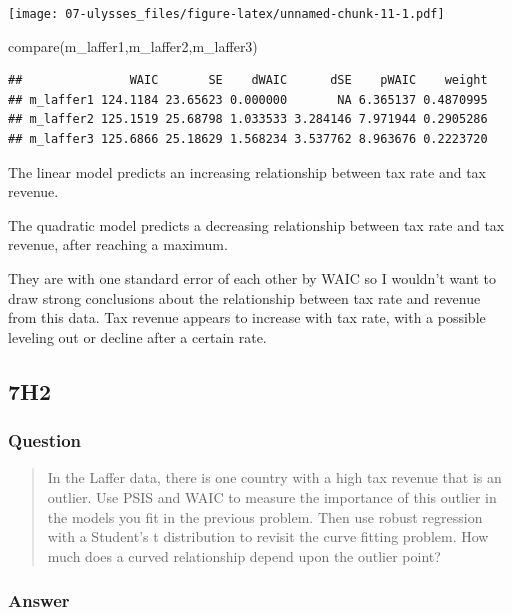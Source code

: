 \documentclass[
]{book}
\newenvironment{Shaded}{\begin{snugshade}}{\end{snugshade}}
\newcommand{\FunctionTok}[1]{\textcolor[rgb]{0.00,0.00,0.00}{#1}}
\newcommand{\NormalTok}[1]{#1}
\begin{document}
\texttt{[image: 07-ulysses\_files/figure-latex/unnamed-chunk-11-1.pdf]}

\begin{Shaded}
\begin{Highlighting}[]
\FunctionTok{compare}\NormalTok{(m\_laffer1,m\_laffer2,m\_laffer3)}
\end{Highlighting}
\end{Shaded}

\begin{verbatim}
##               WAIC       SE    dWAIC      dSE    pWAIC    weight
## m_laffer1 124.1184 23.65623 0.000000       NA 6.365137 0.4870995
## m_laffer2 125.1519 25.68798 1.033533 3.284146 7.971944 0.2905286
## m_laffer3 125.6866 25.18629 1.568234 3.537762 8.963676 0.2223720
\end{verbatim}

The linear model predicts an increasing relationship between tax rate and tax revenue.

The quadratic model predicts a decreasing relationship between tax rate and tax revenue, after reaching a maximum.

They are with one standard error of each other by WAIC so I wouldn't want to draw strong conclusions about the relationship between tax rate and revenue from this data. Tax revenue appears to increase with tax rate, with a possible leveling out or decline after a certain rate.

\hypertarget{h2-3}{%
\subsection*{7H2}\label{h2-3}}

\hypertarget{question-71}{%
\subsubsection*{Question}\label{question-71}}

\begin{quote}
In the Laffer data, there is one country with a high tax revenue that is an outlier. Use PSIS and WAIC to measure the importance of this outlier in the models you fit in the previous problem. Then use robust regression with a Student's t distribution to revisit the curve fitting problem. How much does a curved relationship depend upon the outlier point?
\end{quote}

\hypertarget{answer-71}{%
\subsubsection*{Answer}\label{answer-71}}
\end{document}
